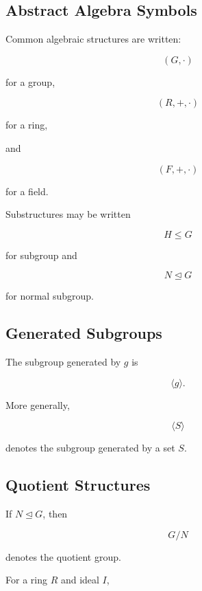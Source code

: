 \subsection{Abstract Algebra Symbols}
\label{subsec:abstract-algebra-symbols-reference}

Common algebraic structures are written:

\[
\boxed{
(G,\cdot)
}
\]

for a group,

\[
\boxed{
(R,+,\cdot)
}
\]

for a ring,

and

\[
\boxed{
(F,+,\cdot)
}
\]

for a field.

Substructures may be written

\[
\boxed{
H\leq G
}
\]

for subgroup and

\[
\boxed{
N\trianglelefteq G
}
\]

for normal subgroup.

\subsection{Generated Subgroups}
\label{subsec:generated-subgroup-reference}

The subgroup generated by \(g\) is

\[
\boxed{
\langle g\rangle.
}
\]

More generally,

\[
\boxed{
\langle S\rangle
}
\]

denotes the subgroup generated by a set \(S\).

\subsection{Quotient Structures}
\label{subsec:quotient-symbols-reference}

If \(N\trianglelefteq G\), then

\[
\boxed{
G/N
}
\]

denotes the quotient group.

For a ring \(R\) and ideal \(I\),

